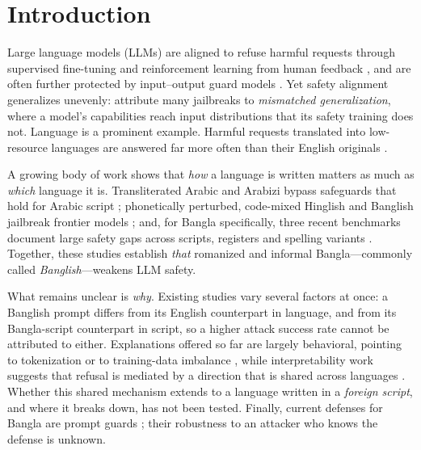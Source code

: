
\providecommand{\todo}[1]{\textcolor{red}{[#1]}}

\section{Introduction}

Large language models (LLMs) are aligned to refuse harmful requests through
supervised fine-tuning and reinforcement learning from human feedback
\citep{ouyang2022training, bai2022constitutional}, and are often further
protected by input--output guard models \citep{inan2023llamaguard,
zeng2024shieldgemma}. Yet safety alignment generalizes unevenly:
\citet{wei2023jailbroken} attribute many jailbreaks to \emph{mismatched
generalization}, where a model's capabilities reach input distributions that
its safety training does not. Language is a prominent example. Harmful
requests translated into low-resource languages are answered far more often
than their English originals \citep{yong2023lowresource,
deng2024multilingual, wang2024languages}.

A growing body of work shows that \emph{how} a language is written matters as
much as \emph{which} language it is. Transliterated Arabic and Arabizi bypass
safeguards that hold for Arabic script \citep{ghanim2024arabizi};
phonetically perturbed, code-mixed Hinglish and Banglish jailbreak frontier
models \citep{aswal2025cmprt}; and, for Bangla specifically, three recent
benchmarks document large safety gaps across scripts, registers and
spelling variants \citep{banglaveilguard2026, banglasafe2026,
alignedform2026}. Together, these studies establish \emph{that} romanized
and informal Bangla---commonly called \emph{Banglish}---weakens LLM safety.

What remains unclear is \emph{why}. Existing studies vary several factors at
once: a Banglish prompt differs from its English counterpart in language,
and from its Bangla-script counterpart in script, so a higher attack success
rate cannot be attributed to either. Explanations offered so far are
largely behavioral, pointing to tokenization \citep{aswal2025cmprt} or to
training-data imbalance \citep{alignedform2026}, while interpretability work
suggests that refusal is mediated by a direction that is shared across
languages \citep{arditi2024refusal, wang2025refusaluniversal}. Whether this
shared mechanism extends to a language written in a \emph{foreign script},
and where it breaks down, has not been tested. Finally, current defenses
for Bangla are prompt guards \citep{banglaveilguard2026}; their robustness to
an attacker who knows the defense \citep{nasr2025attacker} is unknown.

